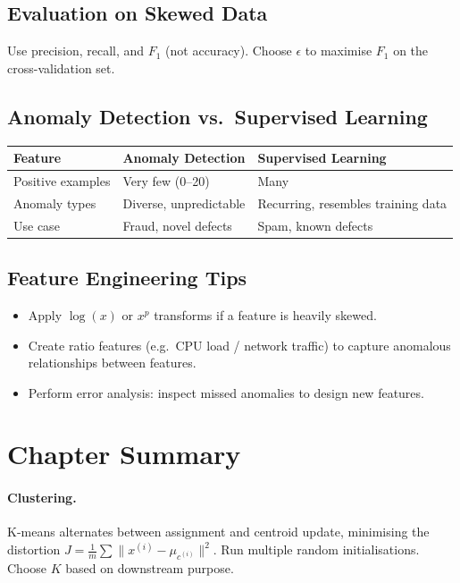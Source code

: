 \subsection{Evaluation on Skewed Data}

Use precision, recall, and $F_1$ (not accuracy). Choose $\epsilon$ to maximise
$F_1$ on the cross-validation set.

\subsection{Anomaly Detection vs.\ Supervised Learning}

\begin{center}
\begin{tabular}{lp{5.2cm}p{5.2cm}}
\toprule
\textbf{Feature} & \textbf{Anomaly Detection} & \textbf{Supervised Learning}\\
\midrule
Positive examples & Very few (0--20) & Many\\
Anomaly types & Diverse, unpredictable & Recurring, resembles training data\\
Use case & Fraud, novel defects & Spam, known defects\\
\bottomrule
\end{tabular}
\end{center}

\subsection{Feature Engineering Tips}

\begin{itemize}
\item Apply $\log(x)$ or $x^p$ transforms if a feature is heavily skewed.
\item Create ratio features (e.g.\ CPU load / network traffic) to capture
  anomalous relationships between features.
\item Perform error analysis: inspect missed anomalies to design new features.
\end{itemize}

\section*{Chapter Summary}

\paragraph{Clustering.} K-means alternates between assignment and centroid
update, minimising the distortion $J=\tfrac{1}{m}\sum\|x^{(i)}-\mu_{c^{(i)}}\|^2$.
Run multiple random initialisations. Choose $K$ based on downstream purpose.

